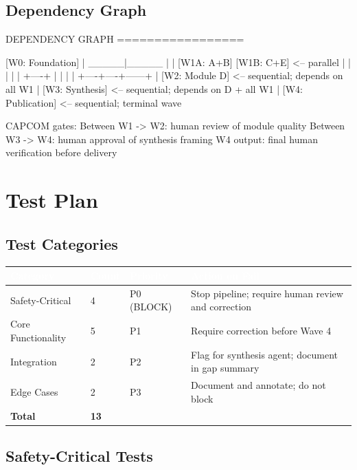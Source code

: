 \documentclass[11pt,letterpaper]{article}
\newcommand{\tableheader}[1]{\textbf{\sffamily\textcolor{white}{#1}}}
\begin{document}
\subsection{Dependency Graph}

\begin{asciibox}
DEPENDENCY GRAPH
=================

  [W0: Foundation]
        |
   _____|_____
  |           |
[W1A: A+B]  [W1B: C+E]    <-- parallel
  |     |    |     |
  |     +----+     |
  |         |      |
  +----+----+------+
       |
  [W2: Module D]            <-- sequential; depends on all W1
       |
  [W3: Synthesis]            <-- sequential; depends on D + all W1
       |
  [W4: Publication]          <-- sequential; terminal wave

  CAPCOM gates:
    Between W1 -> W2: human review of module quality
    Between W3 -> W4: human approval of synthesis framing
    W4 output: final human verification before delivery
\end{asciibox}

\section{Test Plan}

\subsection{Test Categories}

\begin{center}
\begin{tabularx}{\textwidth}{L{4cm}C{2cm}C{2cm}X}
\toprule
{}
\tableheader{Category} & \tableheader{Count} & \tableheader{Priority} & \tableheader{Action on Fail} \\
\midrule
Safety-Critical & 4 & P0 (BLOCK) & Stop pipeline; require human review and correction \\
Core Functionality & 5 & P1 & Require correction before Wave 4 \\
Integration & 2 & P2 & Flag for synthesis agent; document in gap summary \\
Edge Cases & 2 & P3 & Document and annotate; do not block \\
\midrule
\textbf{Total} & \textbf{13} & & \\
\bottomrule
\end{tabularx}
\end{center}

\subsection{Safety-Critical Tests}
\end{document}
